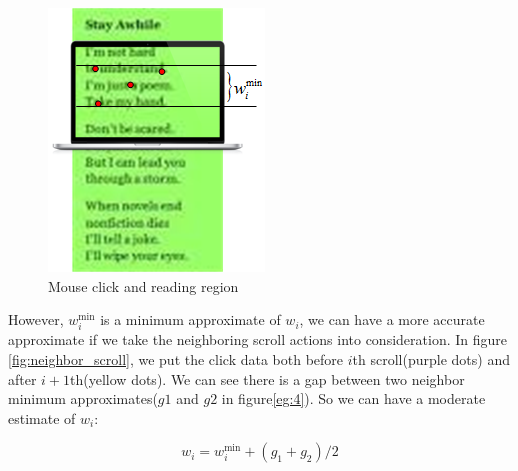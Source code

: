 \documentclass{sigchi}
\begin{document}
\begin{figure}[!h]
\centering
\includegraphics[width=0.7\columnwidth]{pictures/single_click}
\caption{Mouse click and reading region}
\label{fig:single_click}
\end{figure}

However, $w_i^{\min }$ is a minimum approximate of $w_i$, we can have a more accurate approximate if we take the neighboring 
scroll actions into consideration. In figure \ref{fig:neighbor_scroll}, we put the click data both before $i$th scroll(purple dots) and after $i+1$th(yellow dots).
We can see there is a gap between two neighbor minimum approximates($g1$ and $g2$ in figure\ref{eg:4}). So we can have a moderate estimate of $w_i$:

\begin{equation} \label{eq:4}
{w_i} = w_i^{\min } + ({g_1} + {g_2})/2
\end{equation}
 
\end{document}
